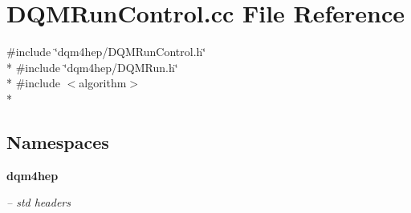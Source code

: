 \section{D\+Q\+M\+Run\+Control.\+cc File Reference}
\label{DQMRunControl_8cc}
{\ttfamily \#include \char`\"{}dqm4hep/\+D\+Q\+M\+Run\+Control.\+h\char`\"{}}\\*
{\ttfamily \#include \char`\"{}dqm4hep/\+D\+Q\+M\+Run.\+h\char`\"{}}\\*
{\ttfamily \#include $<$algorithm$>$}\\*
\subsection*{Namespaces}
\begin{DoxyCompactItemize}
\item 
 {\bf dqm4hep}
\begin{DoxyCompactList}\small\item\em -- std headers \end{DoxyCompactList}\end{DoxyCompactItemize}
